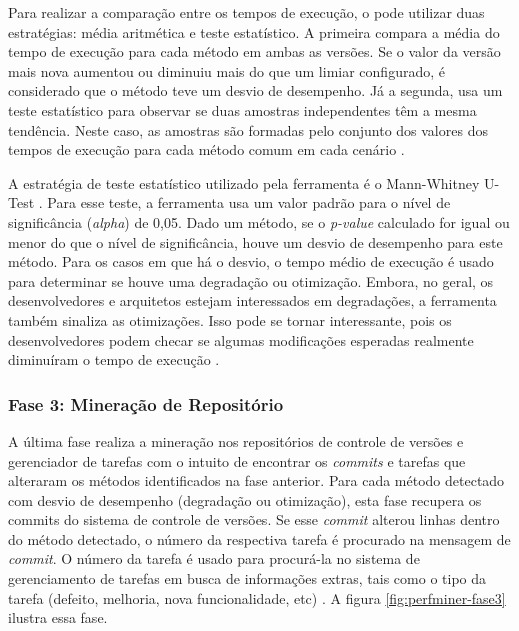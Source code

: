 Para realizar a comparação entre os tempos de execução, o \textit{\perfMinerName} pode utilizar duas estratégias: média aritmética e teste estatístico. A primeira compara a média do tempo de execução para cada método em ambas as versões. Se o valor da versão mais nova aumentou ou diminuiu mais do que um limiar configurado, é considerado que o método teve um desvio de desempenho. Já a segunda, usa um teste estatístico para observar se duas amostras independentes têm a mesma tendência. Neste caso, as amostras são formadas pelo conjunto dos valores dos tempos de execução para cada método comum em cada cenário \cite{Pinto2015}.

A estratégia de teste estatístico utilizado pela ferramenta é o Mann-Whitney U-Test \cite{Neuhauser2011}. Para esse teste, a ferramenta usa um valor padrão para o nível de significância (\textit{alpha}) de 0,05. Dado um método, se o \textit{p-value} calculado for igual ou menor do que o nível de significância, houve um desvio de desempenho para este método. Para os casos em que há o desvio, o tempo médio de execução é usado para determinar se houve uma degradação ou otimização. Embora, no geral, os desenvolvedores e arquitetos estejam interessados em degradações, a ferramenta também sinaliza as otimizações. Isso pode se tornar interessante, pois os desenvolvedores podem checar se algumas modificações esperadas realmente diminuíram o tempo de execução \cite{Pinto2015}.

\subsubsection{Fase 3: Mineração de Repositório} \label{subsec:fase3}

A última fase realiza a mineração nos repositórios de controle de versões e gerenciador de tarefas com o intuito de encontrar os \textit{commits} e tarefas que alteraram os métodos identificados na fase anterior. Para cada método detectado com desvio de desempenho (degradação ou otimização), esta fase recupera os commits do sistema de controle de versões. Se esse \textit{commit} alterou linhas dentro do método detectado, o número da respectiva tarefa é procurado na mensagem de \textit{commit}. O número da tarefa é usado para procurá-la no sistema de gerenciamento de tarefas em busca de informações extras, tais como o tipo da tarefa (defeito, melhoria, nova funcionalidade, etc) \cite{Pinto2015}. A figura \ref{fig:perfminer-fase3} ilustra essa fase.


